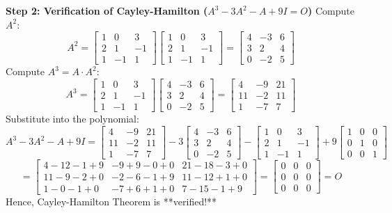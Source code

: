 \begin{solutionbox}
\textbf{Step 2: Verification of Cayley-Hamilton ($A^3 - 3A^2 - A + 9I = O$)}
Compute $A^2$:
\[
A^2 = \begin{bmatrix} 1 & 0 & 3 \\ 2 & 1 & -1 \\ 1 & -1 & 1 \end{bmatrix} \begin{bmatrix} 1 & 0 & 3 \\ 2 & 1 & -1 \\ 1 & -1 & 1 \end{bmatrix} = \begin{bmatrix} 4 & -3 & 6 \\ 3 & 2 & 4 \\ 0 & -2 & 5 \end{bmatrix}
\]
Compute $A^3 = A \cdot A^2$:
\[
A^3 = \begin{bmatrix} 1 & 0 & 3 \\ 2 & 1 & -1 \\ 1 & -1 & 1 \end{bmatrix} \begin{bmatrix} 4 & -3 & 6 \\ 3 & 2 & 4 \\ 0 & -2 & 5 \end{bmatrix} = \begin{bmatrix} 4 & -9 & 21 \\ 11 & -2 & 11 \\ 1 & -7 & 7 \end{bmatrix}
\]
Substitute into the polynomial:
\[
A^3 - 3A^2 - A + 9I = \begin{bmatrix} 4 & -9 & 21 \\ 11 & -2 & 11 \\ 1 & -7 & 7 \end{bmatrix} - 3\begin{bmatrix} 4 & -3 & 6 \\ 3 & 2 & 4 \\ 0 & -2 & 5 \end{bmatrix} - \begin{bmatrix} 1 & 0 & 3 \\ 2 & 1 & -1 \\ 1 & -1 & 1 \end{bmatrix} + 9\begin{bmatrix} 1 & 0 & 0 \\ 0 & 1 & 0 \\ 0 & 0 & 1 \end{bmatrix}
\]
\[
= \begin{bmatrix} 4 - 12 - 1 + 9 & -9 + 9 - 0 + 0 & 21 - 18 - 3 + 0 \\ 11 - 9 - 2 + 0 & -2 - 6 - 1 + 9 & 11 - 12 + 1 + 0 \\ 1 - 0 - 1 + 0 & -7 + 6 + 1 + 0 & 7 - 15 - 1 + 9 \end{bmatrix} = \begin{bmatrix} 0 & 0 & 0 \\ 0 & 0 & 0 \\ 0 & 0 & 0 \end{bmatrix} = O
\]
Hence, Cayley-Hamilton Theorem is **verified!**


\end{solutionbox}
